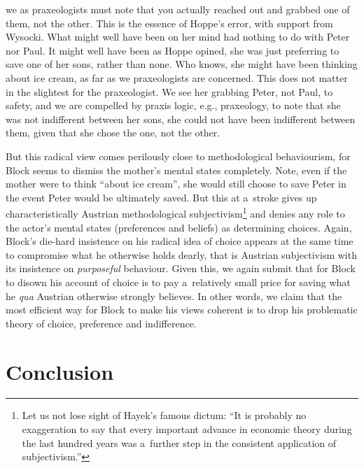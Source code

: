we as praxeologists must note that you actually reached out and grabbed one of them, not the other. This is the essence of Hoppe's error, with support from Wysocki. What might well have been on her mind had nothing to do with Peter nor Paul. It might well have been as Hoppe opined, she was just preferring to save one of her sons, rather than none. Who knows, she might have been thinking about ice cream, as far as we praxeologists are concerned. This does not matter in the slightest for the praxeologist. We see her grabbing Peter, not Paul, to safety, and we are compelled by praxis logic, e.g., praxeology, to note that she was not indifferent between her sons, she could not have been indifferent between them, given that she chose the one, not the other.



But this radical view comes perilously close to methodological behaviourism, for Block seems to dismiss the mother's mental states completely. Note, even if the mother were to think ``about ice cream'', she would still choose to save Peter in the event Peter would be ultimately saved. But this at a~stroke gives up characteristically Austrian methodological subjectivism\footnote{Let us not lose sight of Hayek's 
\parencite*[][p.31]{hayek_counter-revolution_1952} %
 famous dictum: ``It is probably no exaggeration to say that every important advance in economic theory during the last hundred years was a~further step in the consistent application of subjectivism.'' } and denies any role to the actor's mental states (preferences and beliefs) as determining choices. Again, Block's die-hard insistence on his radical idea of choice appears at the same time to compromise what he otherwise holds dearly, that is Austrian subjectivism with its insistence on \textit{purposeful} behaviour. Given this, we again submit that for Block to disown his account of choice is to pay a~relatively small price for saving what he \textit{qua} Austrian otherwise strongly believes. In other words, we claim that the most efficient way for Block to make his views coherent is to drop his problematic theory of choice, preference and indifference.



\section{Conclusion}

